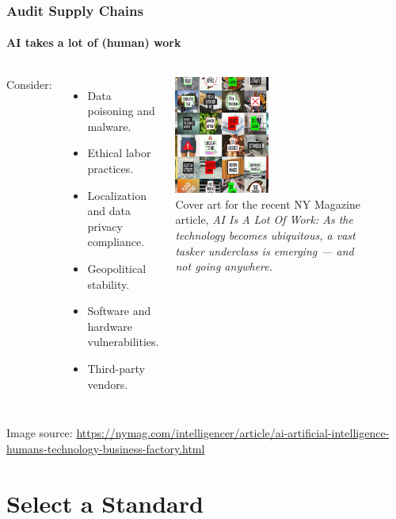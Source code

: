 \documentclass[11pt,
               aspectratio=169,
               hyperref={colorlinks}
               ]{beamer}
\begin{document}
\begin{frame}
	
	\frametitle{Audit Supply Chains}
	\framesubtitle{AI takes a lot of (human) work}
	
	\begin{columns}
	
		Consider:
		\begin{itemize}
			\item Data poisoning and malware.
			\item Ethical labor practices.
			\item Localization and data privacy compliance. 
			\item Geopolitical stability. 
			\item Software and hardware vulnerabilities.
			\item Third-party vendors. 
		\end{itemize}
	
		\centering
		\includegraphics[height=110pt]{../img/Audit_SC.png}\\

		\scriptsize{\tiny{Cover art for the recent NY Magazine article, \textit{AI Is A Lot Of Work: As the technology becomes ubiquitous, a vast tasker underclass is emerging — and not going anywhere.}}}
		\par\noindent\rule{100pt}{0.4pt}\\

	\end{columns}

	\noindent\scriptsize{Image source: \url{https://nymag.com/intelligencer/article/ai-artificial-intelligence-humans-technology-business-factory.html}}

	
\end{frame}



	\section{Select a Standard}
\end{document}
